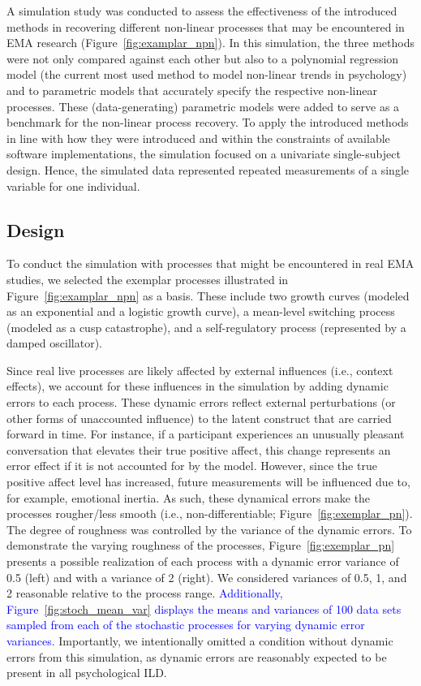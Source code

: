\documentclass[man, floatsintext]{apa7}
\begin{document}
A simulation study was conducted to assess the effectiveness of the introduced
methods in recovering different non-linear processes that may be encountered in
EMA research (Figure~\ref{fig:examplar_npn}). In this simulation, the three
methods were not only compared against each other but also to a polynomial
regression model (the current most used method to model non-linear trends in
psychology) and to parametric models that accurately specify the respective
non-linear processes. These (data-generating) parametric models were added to
serve as a benchmark for the non-linear process recovery. To apply the
introduced methods in line with how they were introduced and within the
constraints of available software implementations, the simulation focused on a
univariate single-subject design. Hence, the simulated data represented
repeated measurements of a single variable for one individual.

\subsection{Design}

To conduct the simulation with processes that might be encountered in real EMA
studies, we selected the exemplar processes illustrated in
Figure~\ref{fig:examplar_npn} as a basis. These include two growth curves
(modeled as an exponential and a logistic growth curve), a mean-level switching
process (modeled as a cusp catastrophe), and a self-regulatory process
(represented by a damped oscillator).

Since real live processes are likely affected by external influences (i.e.,
context effects), we account for these influences in the simulation by adding
dynamic errors to each process. These dynamic errors reflect external
perturbations (or other forms of unaccounted influence) to the latent construct
that are carried forward in time. For instance, if a participant experiences an
unusually pleasant conversation that elevates their true positive affect, this
change represents an error effect if it is not accounted for by the model.
However, since the true positive affect level has increased, future
measurements will be influenced due to, for example, emotional inertia. As
such, these dynamical errors make the processes rougher/less smooth (i.e.,
non-differentiable; Figure~\ref{fig:exemplar_pn}). The degree of roughness was
controlled by the variance of the dynamic errors. To demonstrate the varying
roughness of the processes, Figure~\ref{fig:exemplar_pn} presents a possible
realization of each process with a dynamic error variance of 0.5 (left) and
with a variance of 2 (right). We considered variances of 0.5, 1, and 2
reasonable relative to the process range. \textcolor{blue}{ Additionally,
  Figure~\ref{fig:stoch_mean_var} displays the means and variances of 100 data
  sets sampled from each of the stochastic processes for varying dynamic error
  variances. } Importantly, we intentionally omitted a condition without
dynamic
errors from this simulation, as dynamic errors are reasonably expected to be
present in all psychological ILD\@.
\end{document}
